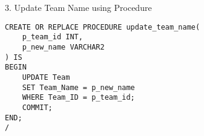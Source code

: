 3. Update Team Name using Procedure

\begin{lstlisting}[caption={ Query 3},label={lst:q-3}]
    CREATE OR REPLACE PROCEDURE update_team_name(
    p_team_id INT,
    p_new_name VARCHAR2
) IS
BEGIN
    UPDATE Team
    SET Team_Name = p_new_name
    WHERE Team_ID = p_team_id;
    COMMIT;
END;
/

\end{lstlisting}

